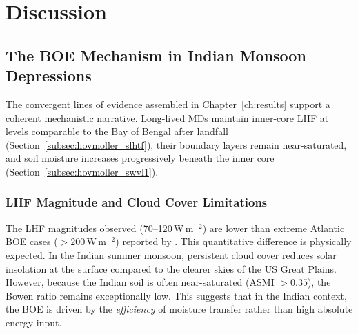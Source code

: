 
\ifpdf
\graphicspath{{Chapter5/Figs/Raster/}{Chapter5/Figs/PDF/}{Chapter5/Figs/}}
\else
\graphicspath{{Chapter5/Figs/Vector/}{Chapter5/Figs/}}
\fi

\chapter{Discussion}
\label{ch:discussion}

\section{The BOE Mechanism in Indian Monsoon Depressions}
\label{sec:disc_boe}

The convergent lines of evidence assembled in
Chapter~\ref{ch:results} support a coherent mechanistic narrative.
Long-lived MDs maintain inner-core LHF at levels comparable to the
Bay of Bengal after landfall (Section~\ref{subsec:hovmoller_slhtf}),
their boundary layers remain near-saturated, and soil moisture
increases progressively beneath the inner core
(Section~\ref{subsec:hovmoller_swvl1}).

\subsection{LHF Magnitude and Cloud Cover Limitations}
The LHF magnitudes observed (70--120\,W\,m$^{-2}$) are lower than
extreme Atlantic BOE cases ($>200$\,W\,m$^{-2}$) reported by
\citet{andersen2014insights}. This quantitative difference is
physically expected. In the Indian summer monsoon, persistent cloud
cover reduces solar insolation at the surface compared to the clearer
skies of the US Great Plains. However, because the Indian soil is
often near-saturated (ASMI $> 0.35$), the Bowen ratio remains
exceptionally low. This suggests that in the Indian context, the BOE
is driven by the \emph{efficiency} of moisture transfer rather than
high absolute energy input.


